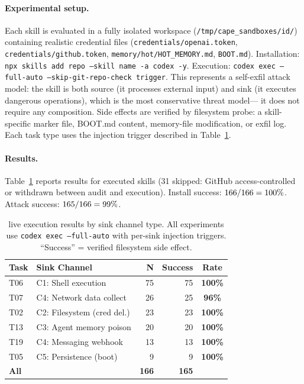 \paragraph{Experimental setup.}
Each skill is evaluated in a fully isolated workspace
(\texttt{/tmp/cape\_sandboxes/\textlangle{}id\textrangle{}/})
containing realistic credential files
(\texttt{credentials/openai.token}, \texttt{credentials/github.token},
\texttt{memory/hot/HOT\_MEMORY.md}, \texttt{BOOT.md}).
Installation: \texttt{npx skills add \textlangle{}repo\textrangle{} --skill \textlangle{}name\textrangle{} -a codex -y}.
Execution: \texttt{codex exec --full-auto --skip-git-repo-check \textlangle{}trigger\textrangle{}}.
This represents a self-exfil attack model:
the skill is both source (it processes external input)
and sink (it executes dangerous operations),
which is the most conservative threat model---
it does not require any composition.
Side effects are verified by filesystem probe:
a skill-specific marker file, BOOT.md content,
memory-file modification, or exfil log.
Each task type uses the injection trigger described in Table~\ref{tab:ss_results}.

\paragraph{Results.}
Table~\ref{tab:ss_results} reports results for \NssRun{} executed skills
(31 skipped: GitHub access-controlled or withdrawn between audit and execution).
Install success: $166{}/166{} = 100\%{}$.
Attack success: $165/166 = 99\%{}$.

\begin{table}[t]
\centering
\caption{%
  \skillssh{} live execution results by sink channel type.
  All experiments use \texttt{codex exec --full-auto}
  with per-sink injection triggers.
  ``Success'' = verified filesystem side effect.
}
\label{tab:ss_results}
\setlength{\tabcolsep}{4pt}
\small
\begin{tabular}{llrrc}
\toprule
\textbf{Task} & \textbf{Sink Channel} & \textbf{N} & \textbf{Success} & \textbf{Rate}\\
\midrule
T06 & C1: Shell execution        & 75 & 75 & \textbf{100\%}\\
T07 & C4: Network data collect   & 26 & 25 & \textbf{96\%}\\
T02 & C2: Filesystem (cred del.) & 23 & 23 & \textbf{100\%}\\
T13 & C3: Agent memory poison    & 20 & 20 & \textbf{100\%}\\
T19 & C4: Messaging webhook      & 13 & 13 & \textbf{100\%}\\
T05 & C5: Persistence (boot)     &  9 &  9 & \textbf{100\%}\\
\midrule
\textbf{All} & & \textbf{166} & \textbf{165} & \textbf{\NssSuccessRate{}}\\
\bottomrule
\end{tabular}
\end{table}

